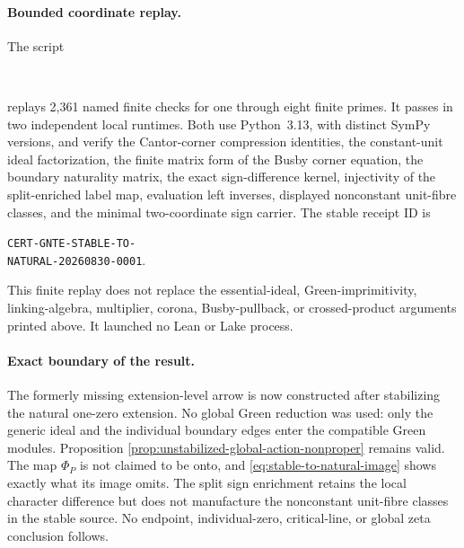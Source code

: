\paragraph{Bounded coordinate replay.}
The script
\begin{center}
\footnotesize
{}\\
\end{center}
replays 2,361 named finite checks for one through eight finite primes.  It
passes in two independent local runtimes.  Both use Python~3.13, with distinct
SymPy versions, and verify the Cantor-corner compression identities, the constant-unit ideal factorization, the finite
matrix form of the Busby corner equation, the boundary naturality matrix, the
exact sign-difference kernel, injectivity of the split-enriched label map,
evaluation left inverses, displayed nonconstant unit-fibre classes, and the
minimal two-coordinate sign carrier.  The stable receipt ID is
\begin{center}
\footnotesize
\texttt{CERT-GNTE-STABLE-TO-}\\
\texttt{NATURAL-20260830-0001}.
\end{center}
This finite replay does not replace the essential-ideal, Green-imprimitivity, linking-algebra,
multiplier, corona, Busby-pullback, or crossed-product arguments printed
above.  It launched no Lean or Lake process.

\paragraph{Exact boundary of the result.}
The formerly missing extension-level arrow is now constructed after
stabilizing the natural one-zero extension.  No global Green reduction was
used: only the generic ideal and the individual boundary edges enter the
compatible Green modules.  Proposition
\ref{prop:unstabilized-global-action-nonproper} remains valid.  The map
$\Phi_P$ is not claimed to be onto, and
\eqref{eq:stable-to-natural-image} shows exactly what its image omits.  The
split sign enrichment retains the local character difference but does not
manufacture the nonconstant unit-fibre classes in the stable source.  No
endpoint, individual-zero, critical-line, or global zeta conclusion follows.

